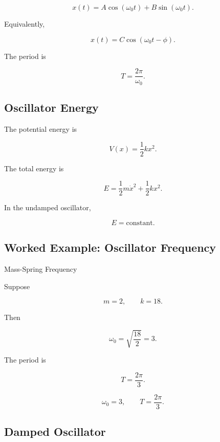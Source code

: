\[
\boxed{
x(t)
=
A\cos(\omega_0t)
+
B\sin(\omega_0t).
}
\]

Equivalently,

\[
\boxed{
x(t)
=
C\cos(\omega_0t-\phi).
}
\]

The period is

\[
\boxed{
T
=
\frac{2\pi}{\omega_0}.
}
\]

\subsection{Oscillator Energy}
\label{subsec:harmonic-oscillator-energy}

The potential energy is

\[
\boxed{
V(x)
=
\frac12kx^2.
}
\]

The total energy is

\[
\boxed{
E
=
\frac12m\dot{x}^2
+
\frac12kx^2.
}
\]

In the undamped oscillator,

\[
\boxed{
E
=
\text{constant}.
}
\]

\subsection{Worked Example: Oscillator Frequency}
\label{subsec:worked-oscillator-frequency}

\begin{workedexamplebox}{Mass-Spring Frequency}

Suppose

\[
m=2,
\qquad
k=18.
\]

Then

\[
\omega_0
=
\sqrt{\frac{18}{2}}
=
3.
\]

The period is

\[
T
=
\frac{2\pi}{3}.
\]

\begin{answerbox}
\[
\boxed{
\omega_0=3,
\qquad
T=\frac{2\pi}{3}.
}
\]
\end{answerbox}

\end{workedexamplebox}

\subsection{Damped Oscillator}
\label{subsec:damped-oscillator}

